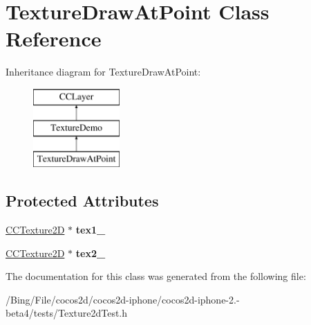 \hypertarget{interface_texture_draw_at_point}{\section{Texture\-Draw\-At\-Point Class Reference}
\label{interface_texture_draw_at_point}
}
Inheritance diagram for Texture\-Draw\-At\-Point\-:\begin{figure}[H]
\begin{center}
\leavevmode
\includegraphics[height=3.000000cm]{interface_texture_draw_at_point}
\end{center}
\end{figure}
\subsection*{Protected Attributes}
\begin{DoxyCompactItemize}
\item 
\hypertarget{interface_texture_draw_at_point_a16067a6c979b812e986744514096f73b}{\hyperlink{class_c_c_texture2_d}{C\-C\-Texture2\-D} $\ast$ {\bfseries tex1\-\_\-}}\label{interface_texture_draw_at_point_a16067a6c979b812e986744514096f73b}

\item 
\hypertarget{interface_texture_draw_at_point_a2bd5555f52feb81c104eaf9960c4d547}{\hyperlink{class_c_c_texture2_d}{C\-C\-Texture2\-D} $\ast$ {\bfseries tex2\-\_\-}}\label{interface_texture_draw_at_point_a2bd5555f52feb81c104eaf9960c4d547}

\end{DoxyCompactItemize}


The documentation for this class was generated from the following file\-:\begin{DoxyCompactItemize}
\item 
/\-Bing/\-File/cocos2d/cocos2d-\/iphone/cocos2d-\/iphone-\/2.-\/beta4/tests/Texture2d\-Test.\-h\end{DoxyCompactItemize}
